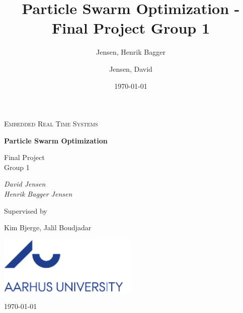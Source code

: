 \documentclass{article}
\title{Particle Swarm Optimization - Final Project \newline Group 1}
\author{Jensen, Henrik Bagger \and Jensen, David}
\date{\today}
\begin{document}
\begin{titlepage}
	\centering
	
	{\scshape\Large Embedded Real Time Systems \par}
	\vspace{1.5cm}
	{\huge\bfseries Particle Swarm Optimization\par}
	Final Project \\ Group 1\\
	\vspace{2cm}
	{\Large\itshape David Jensen\\Henrik Bagger Jensen\par}
	\vfill
	Supervised by\par
	Kim Bjerge, Jalil Boudjadar
	
	\vfill
	\includegraphics[width=0.5\textwidth]{figures/aulogo_uk_var1_blue.pdf}\par\vspace{1cm}
	\vspace{1cm}
	{\large \today\par}
\end{titlepage}


\newpage
\tableofcontents
\newpage









\end{document}
